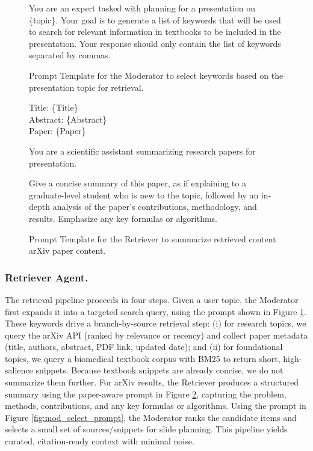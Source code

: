 \documentclass[letterpaper]{article} %
\begin{document}
\begin{figure}
\begin{tcolorbox}[colback=gray!10,colframe=black!90,title=Moderator: Keyword Generation Prompt Template.]

You are an expert tasked with planning for a presentation on \{topic\}. 
Your goal is to generate a list of keywords that will be used to search for relevant information in textbooks to be included in the presentation. 
Your response should only contain the list of keywords separated by commas.

\end{tcolorbox}
\caption{Prompt Template for the Moderator to select keywords based on the presentation topic for retrieval. }
\label{fig:mod_keyword_prompt}
\end{figure}


\begin{figure}
\begin{tcolorbox}[colback=gray!10,colframe=black!90,title=Retriever: Source Summarization Prompt Template.]

Title: \{Title\} \\
Abstract: \{Abstract\} \\
Paper: \{Paper\}

You are a scientific assistant summarizing research papers for presentation.

Give a concise summary of this paper, as if explaining to a graduate-level student who is new to the topic, followed by an in-depth analysis of the paper's contributions, methodology, and results. Emphasize any key formulas or algorithms.

\end{tcolorbox}
\caption{Prompt Template for the Retriever to summarize retrieved content arXiv paper content. }
\label{fig:ret_summary_prompt}
\end{figure}



\subsubsection{Retriever Agent.}

The retrieval pipeline proceeds in four steps. Given a user topic, the Moderator first expands it into a targeted search query, using the prompt shown in Figure \ref{fig:mod_keyword_prompt}. These keywords drive a branch-by-source retrieval step: (i) for research topics, we query the arXiv API (ranked by relevance or recency) and collect paper metadata (title, authors, abstract, PDF link, updated date); and (ii) for foundational topics, we query a biomedical textbook corpus with BM25 to return short, high-salience snippets. Because textbook snippets are already concise, we do not summarize them further. For arXiv results, the Retriever produces a structured summary using the paper-aware prompt in Figure \ref{fig:ret_summary_prompt}, capturing the problem, methods, contributions, and any key formulas or algorithms. Using the prompt in Figure \ref{fig:mod_select_prompt}, the Moderator ranks the candidate items and selects a small set of sources/snippets for slide planning. This pipeline yields curated, citation-ready context with minimal noise.
\end{document}
